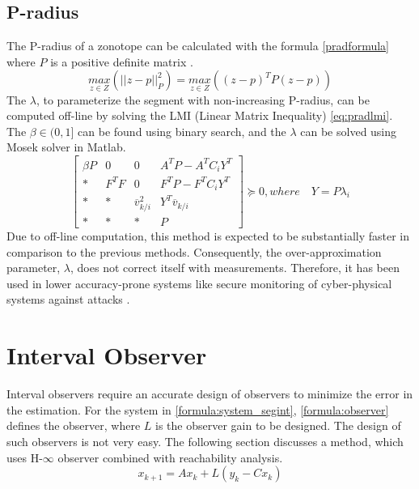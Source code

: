 \subsection{P-radius}
The P-radius of a zonotope can be calculated with the formula \eqref{pradformula} where $P$ is a positive definite matrix \cite{Alamo2005}.
\begin{equation}
\label{pradformula}
\underset{z \in Z}{max} (||z - p||^2_{P}) = \underset{z \in Z}{max}((z-p)^T P (z-p))
\end{equation}
The $\lambda$, to parameterize the segment with non-increasing P-radius, can be computed off-line by solving the LMI (Linear Matrix Inequality) \eqref{eq:pradlmi}. The $\beta \in (0,1]$ can be found using binary search, and the $\lambda$ can be solved using Mosek solver in Matlab\textsuperscript{\tiny\textregistered}.
\begin{equation}
\label{eq:pradlmi}
\left[
\begin{matrix}
\beta P & 0 & 0 & A^TP - A^TC_iY^T\\
* & F^TF & 0 & F^TP -F^TC_iY^T\\
* & * & \overline{v}_{k/i}^2 & Y^T\overline{v}_{k/i}\\
* & * & * & P
\end{matrix}\right] \succeq 0,
where\quad Y = P\lambda_i
\end{equation}
Due to off-line computation, this method is expected to be substantially faster in comparison to the previous methods. Consequently, the over-approximation parameter, $\lambda$, does not correct itself with measurements. Therefore, it has been used in lower accuracy-prone systems like secure monitoring of cyber-physical systems against attacks \cite{GE20201592}. 

\section{Interval Observer}
Interval observers require an accurate design of observers to minimize the error in the estimation. For the system in \eqref{formula:system_segint}, \eqref{formula:observer} defines the observer, where $L$ is the observer gain to be designed. The design of such observers is not very easy. The following section discusses a method, which uses H-$\infty$ observer combined with reachability analysis.
\begin{equation}
\label{formula:observer}
x_{k+1} = Ax_k + L(y_k -Cx_k)
\end{equation}

